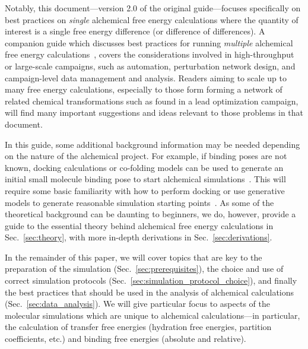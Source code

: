 \documentclass[9pt,bestpractices]{livecoms}
\begin{document}
Notably, this document---version 2.0 of the original guide---focuses specifically on best practices on \textit{single} alchemical free energy calculations where the quantity of interest is a single free energy difference (or difference of differences). A companion guide which discusses best practices for running \textit{multiple} alchemical free energy calculations~\cite{mey_largescale_inprep}, covers the considerations involved in high-throughput or large-scale campaigns, such as automation, perturbation network design, and campaign-level data management and analysis. Readers aiming to scale up to many free energy calculations, especially to those form forming a network of related chemical transformations such as found in a lead optimization campaign, will find many important suggestions and ideas relevant to those problems in that document.

In this guide, some additional background information may be needed depending on the nature of the alchemical project. For example, if binding poses are not known, docking calculations or co-folding models can be used to generate an initial small molecule binding pose to start alchemical simulations~\cite{scheen2025leveraging, thaler2026boltz, coskun_2023, beuming_2022}. This will require some basic familiarity with how to perform docking or use generative models to generate reasonable simulation starting points~\cite{grinter2014challenges}. 
As some of the theoretical background can be daunting to beginners, we do, however, provide a guide to the essential theory behind alchemical free energy calculations in Sec.~\ref{sec:theory}, with more in-depth derivations in Sec.~\ref{sec:derivations}.

In the remainder of this paper, we will cover topics that are key to the preparation of the simulation (Sec.~\ref{sec:prerequisites}), the choice and use of correct simulation protocols (Sec.~\ref{sec:simulation_protocol_choice}), and finally the best practices that should be used in the analysis of alchemical calculations (Sec.~\ref{sec:data_analysis}). 
We will give particular focus to aspects of the molecular simulations which are unique to alchemical calculations---in particular, the calculation of transfer free energies (hydration free energies, partition coefficients, etc.) and binding free energies (absolute and relative). 
\end{document}
